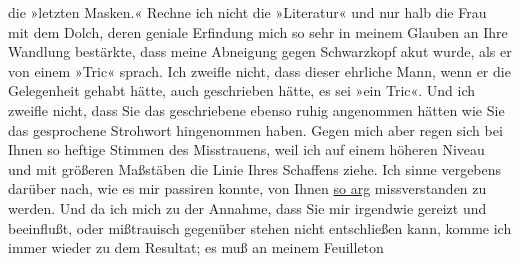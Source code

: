 \begin{ledgroupsized}[t]{13cm}
               die »letzten Masken.« Rechne ich nicht die »Literatur« und nur halb die Frau mit dem Dolch, deren geniale Erfindung mich so sehr in
               meinem Glauben an Ihre Wandlung bestärkte, dass meine Abneigung gegen Schwarzkopf akut wurde, als er von einem »Tric«
               sprach. Ich zweifle nicht, dass dieser ehrliche Mann, wenn er die Gelegenheit gehabt
               hätte, auch geschrieben hätte, es sei »ein Tric«. Und ich zweifle nicht, dass Sie das
               geschriebene ebenso ruhig angenommen hätten wie Sie das gesprochene Strohwort
               hingenommen haben. Gegen mich aber regen sich bei Ihnen so heftige Stimmen des
               Misstrauens, weil ich auf einem höheren Niveau und mit größeren Maßstäben \strikeout{\textcolor{gray}{×}\-\textcolor{gray}{×}\-\textcolor{gray}{×}\-\textcolor{gray}{×}\-\textcolor{gray}{×}\-\textcolor{gray}{×}\-\textcolor{gray}{×}\-\textcolor{gray}{×}\-\textcolor{gray}{×}\-\textcolor{gray}{×}\-\textcolor{gray}{×}\-\textcolor{gray}{×}\-\textcolor{gray}{×}\-\textcolor{gray}{×}\-\textcolor{gray}{×}\-\textcolor{gray}{×}\-\textcolor{gray}{×}\-\textcolor{gray}{×}\-\textcolor{gray}{×}\-\textcolor{gray}{×},} die Linie Ihres
               Schaffens ziehe. \pend
           \pstart
           Ich sinne vergebens darüber nach, wie es mir passiren konnte, von Ihnen \uline{so arg} missverstanden zu werden. Und da ich mich zu
               der Annahme, dass Sie mir irgendwie gereizt und beeinflußt, oder mißtrauisch
               gegenüber stehen nicht entschließen kann, komme ich immer wieder zu dem Resultat; es
               muß an meinem Feuilleton

\end{ledgroupsized}
